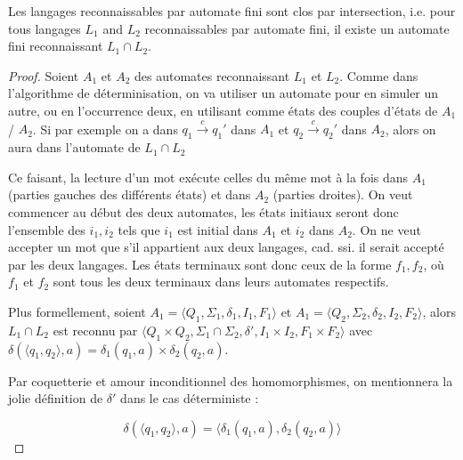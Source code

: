 \begin{theorem}
Les langages reconnaissables par automate fini sont clos par intersection, i.e. pour tous langages $L_1$ and $L_2$ reconnaissables par automate fini, il existe un automate fini reconnaissant $L_1 \cap L_2$.
\end{theorem}

\begin{proof}
Soient $A_1$ et $A_2$ des automates reconnaissant $L_1$ et $L_2$. Comme dans l'algorithme de déterminisation, on va utiliser un automate pour en simuler un autre, ou en l'occurrence deux, en utilisant comme états des couples d'états de $A_1$ / $A_2$. Si par exemple on a dans $q_1 \xrightarrow{c} q_1'$ dans $A_1$ et $q_2 \xrightarrow{c} q_2'$ dans $A_2$, alors on aura dans l'automate de $L_1 \cap L_2$


\begin{figure}[H]
\centering
{}
\end{figure}

Ce faisant, la lecture d'un mot exécute celles du même mot à la fois dans $A_1$ (parties gauches des différents états) et dans $A_2$ (parties droites). On veut commencer au début des deux automates, les états initiaux seront donc l'ensemble des $i_1,i_2$ tels que $i_1$ est initial dans $A_1$ et $i_2$ dans $A_2$. On ne veut accepter un mot que s'il appartient aux deux langages, cad. ssi. il serait accepté par les deux langages. Les états terminaux sont donc ceux de la forme $f_1, f_2$, où $f_1$ et $f_2$ sont tous les deux terminaux dans leurs automates respectifs.

Plus formellement, soient $A_1 = \big \langle Q_1, \Sigma_1, \delta_1, I_1, F_1\big \rangle$ et $A_1 = \big \langle Q_2, \Sigma_2, \delta_2, I_2, F_2\big \rangle$, alors $L_1 \cap L_2$ est reconnu par $\big \langle Q_1 \times Q_2, \Sigma_1 \cap \Sigma_2, \delta', I_1 \times I_2, F_1 \times F_2\big \rangle$ avec $\delta(\big \langle q_1, q_2 \big \rangle,a) = \delta_1(q_1,a) \times \delta_2(q_2,a)$.

Par coquetterie et amour inconditionnel des homomorphismes, on mentionnera la jolie définition de $\delta'$ dans le cas déterministe :

\[
\delta(\big \langle q_1, q_2 \big \rangle,a) = \big \langle \delta_1(q_1,a), \delta_2(q_2,a) \big \rangle
\]

\end{proof}


